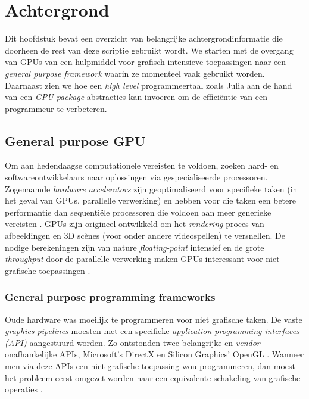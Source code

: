 \chapter{Achtergrond}
\label{chap:rel_work}

Dit hoofdstuk bevat een overzicht van belangrijke achtergrondinformatie die doorheen de rest van deze scriptie gebruikt wordt. We starten met de overgang van GPUs van een hulpmiddel voor grafisch intensieve toepassingen naar een \textit{general purpose framework} waarin ze momenteel vaak gebruikt worden. Daarnaast zien we hoe een \textit{high level} programmeertaal zoals Julia aan de hand van een \textit{GPU package} abstracties kan invoeren om de efficiëntie van een programmeur te verbeteren. 

\section{General purpose GPU}
\label{sec:related_work}

Om aan hedendaagse computationele vereisten te voldoen, zoeken hard- en softwareontwikkelaars naar oplossingen via gespecialiseerde processoren. Zogenaamde \textit{hardware accelerators} zijn geoptimaliseerd voor specifieke taken (in het geval van GPUs, parallelle verwerking) en hebben voor die taken een betere performantie dan sequentiële processoren die voldoen aan meer generieke vereisten \cite{Besard_2019}. GPUs zijn origineel ontwikkeld om het \textit{rendering} proces van afbeeldingen en 3D scènes (voor onder andere videospellen) te versnellen. De nodige berekeningen zijn van nature \textit{floating-point} intensief en de grote \textit{throughput} door de parallelle verwerking maken GPUs interessant voor niet grafische toepassingen \cite{Springer2013}. 

\subsection{General purpose programming frameworks}
\label{subsec:gpp_frameworks}

Oude hardware was moeilijk te programmeren voor niet grafische taken. De vaste \textit{graphics pipelines} moesten met een specifieke \textit{application programming interfaces (API)} aangestuurd worden. Zo ontstonden twee belangrijke en \textit{vendor} onafhankelijke APIs, Microsoft's DirectX \cite{MicrosoftDX2018} en Silicon Graphics' OpenGL \cite{OpenGL2021}. Wanneer men via deze APIs een niet grafische toepassing wou programmeren, dan moest het probleem eerst omgezet worden naar een equivalente schakeling van grafische operaties \cite{Springer2013}.

